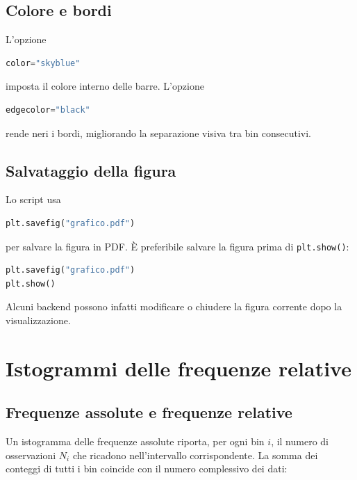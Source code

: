 \documentclass[11pt,a4paper]{book}
\begin{document}
\subsection{Colore e bordi}

L'opzione

\begin{lstlisting}[language=Python]
color="skyblue"
\end{lstlisting}

imposta il colore interno delle barre. L'opzione

\begin{lstlisting}[language=Python]
edgecolor="black"
\end{lstlisting}

rende neri i bordi, migliorando la separazione visiva tra bin
consecutivi.

\subsection{Salvataggio della figura}

Lo script usa

\begin{lstlisting}[language=Python]
plt.savefig("grafico.pdf")
\end{lstlisting}

per salvare la figura in PDF. È preferibile salvare la figura prima di
\texttt{plt.show()}:

\begin{lstlisting}[language=Python]
plt.savefig("grafico.pdf")
plt.show()
\end{lstlisting}

Alcuni backend possono infatti modificare o chiudere la figura corrente
dopo la visualizzazione.


\section{Istogrammi delle frequenze relative}
\label{sec:frequenze-relative}

\subsection{Frequenze assolute e frequenze relative}

Un istogramma delle frequenze assolute riporta, per ogni bin $i$, il
numero di osservazioni $N_i$ che ricadono nell'intervallo corrispondente.
La somma dei conteggi di tutti i bin coincide con il numero complessivo
dei dati:
\end{document}
